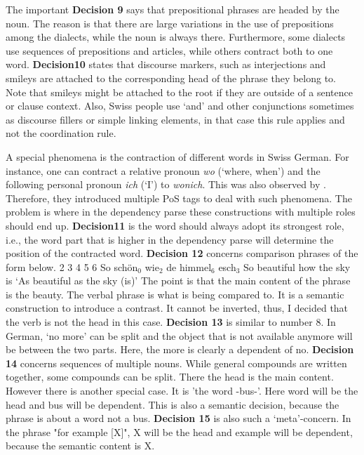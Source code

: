 \documentclass[11pt,letterpaper, covington]{article}
\begin{document}
The important \textbf{Decision 9} says that prepositional phrases are headed by the noun. The reason is that there are large variations in the use of prepositions among the dialects, while the noun is always there. Furthermore, some dialects use sequences of prepositions and articles, while others contract both to one word. \textbf{Decision10} states that discourse markers, such as interjections and smileys are attached to the corresponding head of the phrase they belong to. Note that smileys might be attached to the root if they are outside of a sentence  or clause context. Also, Swiss people use `and' and other conjunctions sometimes as discourse fillers or simple linking elements, in that case this rule applies and not the coordination rule.

A special phenomena is the contraction of different words in Swiss German. For instance, one can contract a relative pronoun \emph{wo} (`where, when') and the following personal pronoun \emph{ich} (`I') to \emph{wonich}. This  was also observed by \cite{AH12}. Therefore, they introduced multiple PoS tags to deal with such phenomena. The problem is where in the dependency parse these constructions with multiple roles should end up. \textbf{Decision11} is the word should always adopt its strongest role, i.e., the word part that is higher in the dependency parse will determine the position of the contracted word.
\textbf{Decision 12} concerns comparison phrases of the form below.
 2 3 4 5 6
So schön$_0$ wie$_2$ de himmel$_6$ esch$_3$
So beautiful how the sky is
\glt `As beautiful as the sky (is)'
\glend
The point is that the main content of the phrase is the beauty. The verbal phrase is what is being compared to. It is a semantic construction to introduce a contrast. It cannot be inverted, thus, I decided that the verb is not the head in this case.  
\textbf{Decision 13} is similar to number 8. In German, `no more' can be split and the object that is not available anymore will be between the two parts. Here, the more is clearly a dependent of no.
\textbf{Decision 14} concerns sequences of multiple nouns. While general compounds are written together, some compounds can be split. There the head is the main content. However there is another special case. It is 'the word -bus-'. Here word will be the head and bus will be dependent. This is also a semantic decision, because the phrase is about a word not a bus.
\textbf{Decision 15} is also such a `meta'-concern. In the phrase "for example [X]", X will be the head and example will be dependent, because the semantic content is X.  
\end{document}

